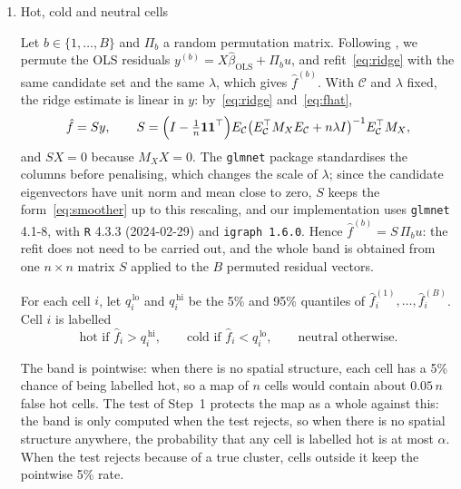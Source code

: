 \begin{enumerate}[label=Step \arabic*:]
\item Hot, cold and neutral cells \label{sec:band}

Let  $b\in\{1,\dots,B\}$ and $\Pi_b$ a random permutation matrix. Following \citet{freedman1983nonstochastic},  we permute the OLS residuals $y^{(b)}=X\hat\beta_{\mathrm{OLS}}+\Pi_b u$, and refit~\eqref{eq:ridge} with the same candidate set and the same $\lambda$, which gives $\hat f^{(b)}$. With $\mathcal{C}$ and $\lambda$ fixed, the ridge estimate is linear in $y$: by~\eqref{eq:ridge} and~\eqref{eq:fhat},
\begin{equation}\label{eq:smoother}
  \hat f = S y, \qquad S = \Bigl(I-\tfrac{1}{n}\mathbf{1}\mathbf{1}^\top\Bigr)E_{\mathcal{C}}\bigl(E_{\mathcal{C}}^\top M_X E_{\mathcal{C}}+n\lambda I\bigr)^{-1}E_{\mathcal{C}}^\top M_X ,
\end{equation}
and $SX=0$ because $M_XX=0$. The \texttt{glmnet} package standardises the columns before penalising, which changes the scale of $\lambda$; since the candidate eigenvectors have unit norm and mean close to zero, $S$ keeps the form~\eqref{eq:smoother} up to this rescaling, and our implementation uses \texttt{glmnet} 4.1-8, with \texttt{R} 4.3.3 (2024-02-29) and \texttt{igraph 1.6.0}. Hence $\hat f^{(b)}=S\,\Pi_b u$: the refit does not need to be carried out, and the whole band is obtained from one $n\times n$ matrix $S$ applied to the $B$ permuted residual vectors. 



 For each cell $i$, let $q_i^{\,\mathrm{lo}}$ and $q_i^{\,\mathrm{hi}}$ be the 5\% and 95\% quantiles of $\hat f_i^{(1)},\dots,\hat f_i^{(B)}$. Cell $i$ is labelled
\begin{equation}\label{eq:labels}
  \text{hot if } \hat f_i>q_i^{\,\mathrm{hi}}, \qquad
  \text{cold if } \hat f_i<q_i^{\,\mathrm{lo}}, \qquad
  \text{neutral otherwise.}
\end{equation}
 

The band is pointwise: when there is no spatial structure, each cell has a 5\% chance
of being labelled hot, so a map of $n$ cells would contain about $0.05\,n$ false hot
cells. The test of Step~1 protects the map as a whole against this: the band is only
computed when the test rejects, so when there is no spatial structure anywhere, the
probability that any cell is labelled hot is at most $\alpha$. When the test rejects
because of a true cluster, cells outside it keep the pointwise 5\% rate.



\end{enumerate}
